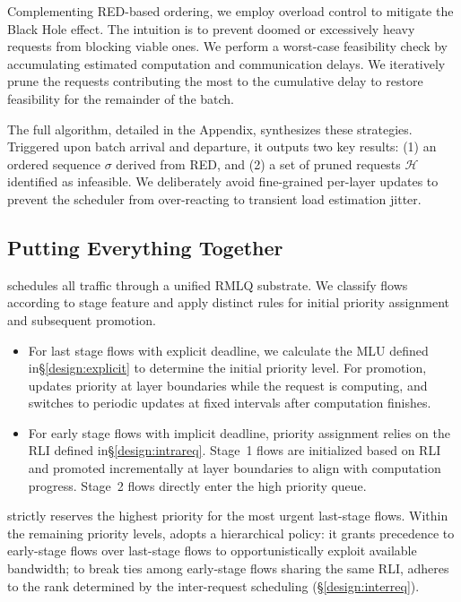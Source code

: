 Complementing RED-based ordering, we employ overload control to mitigate the Black Hole effect. The intuition is to prevent doomed or excessively heavy requests from blocking viable ones. We perform a worst-case feasibility check by accumulating estimated computation and communication delays. We iteratively prune the requests contributing the most to the cumulative delay to restore feasibility for the remainder of the batch.

The full algorithm, detailed in the Appendix, synthesizes these strategies. Triggered upon batch arrival and departure, it outputs two key results: (1) an ordered sequence $\sigma$ derived from RED, and (2) a set of pruned requests $\mathcal{H}$ identified as infeasible. We deliberately avoid fine-grained per-layer updates to prevent the scheduler from over-reacting to transient load estimation jitter.

\subsection{Putting Everything Together}\label{sec:design:PET}

\sys schedules all traffic through a unified RMLQ substrate. We classify flows according to stage feature and apply distinct rules for initial priority assignment and subsequent promotion.

\begin{itemize}[leftmargin=*]
    \item For last stage flows with explicit deadline, we calculate the MLU defined in\S\ref{design:explicit} to determine the initial priority level. For promotion, \sys{} updates priority at layer boundaries while the request is computing, and switches to periodic updates at fixed intervals after computation finishes.
    \item For early stage flows with implicit deadline, priority assignment relies on the RLI defined in\S\ref{design:intrareq}. Stage~1 flows are initialized based on RLI and promoted incrementally at layer boundaries to align with computation progress. Stage~2 flows directly enter the high priority queue.
\end{itemize}

 \sys strictly reserves the highest priority for the most urgent last-stage flows. Within the remaining priority levels, \sys adopts a hierarchical policy: it grants precedence to early-stage flows over last-stage flows to opportunistically exploit available bandwidth; to break ties among early-stage flows sharing the same RLI, \sys adheres to the rank determined by the inter-request scheduling (\S\ref{design:interreq}).
